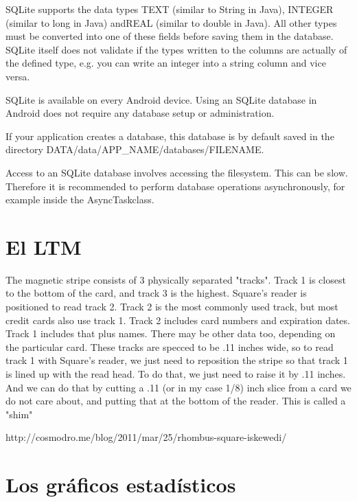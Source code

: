 SQLite supports the data types TEXT (similar to String in Java), INTEGER (similar to long in Java) andREAL (similar to double in Java). All other types must be converted into one of these fields before saving them in the database. SQLite itself does not validate if the types written to the columns are actually of the defined type, e.g. you can write an integer into a string column and vice versa.

SQLite is available on every Android device. Using an SQLite database in Android does not require any database setup or administration.

If your application creates a database, this database is by default saved in the directory DATA/data/APP\_NAME/databases/FILENAME.

Access to an SQLite database involves accessing the filesystem. This can be slow. Therefore it is recommended to perform database operations asynchronously, for example inside the AsyncTaskclass.

\section{El \ac{LTM}}
\label{sec:tpv.ltm}

The magnetic stripe consists of 3 physically separated "tracks". Track 1 is closest to the bottom of the card, and track 3 is the highest. Square's reader is positioned to read track 2. Track 2 is the most commonly used track, but most credit cards also use track 1. Track 2 includes card numbers and expiration dates. Track 1 includes that plus names. There may be other data too, depending on the particular card. These tracks are specced to be .11 inches wide, so to read track 1 with Square's reader, we just need to reposition the stripe so that track 1 is lined up with the read head. To do that, we just need to raise it by .11 inches. And we can do that by cutting a .11 (or in my case 1/8) inch slice from a card we do not care about, and putting that at the bottom of the reader. This is called a "shim"

http://cosmodro.me/blog/2011/mar/25/rhombus-square-iskewedi/

\section{Los gr\'aficos estad\'isticos}
\label{sec:tpv.graphs}

